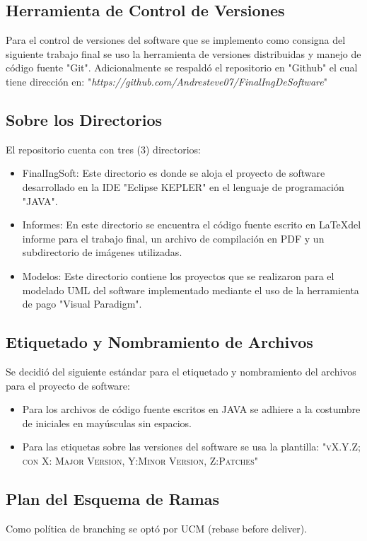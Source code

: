 \documentclass[10pt]{article} %
\begin{document}
\subsection{Herramienta de Control de Versiones}
Para el control de versiones del software que se implemento como consigna del siguiente trabajo final se uso la herramienta de versiones distribuidas y manejo de código fuente "Git". Adicionalmente se respaldó el repositorio en "Github" el cual tiene dirección en: "\textit{https://github.com/Andresteve07/FinalIngDeSoftware}"

\subsection{Sobre los Directorios}
El repositorio cuenta con tres (3) directorios:
\begin{itemize}
\item FinalIngSoft: Este directorio es donde se aloja el proyecto de software desarrollado en la IDE "Eclipse KEPLER" en el lenguaje de programación "JAVA".
\item Informes: En este directorio se encuentra el código fuente escrito en \LaTeX del informe para el trabajo final, un archivo de compilación en PDF y un subdirectorio de imágenes utilizadas.
\item Modelos: Este directorio contiene los proyectos que se realizaron para el modelado UML del software implementado mediante el uso de la herramienta de pago "Visual Paradigm\circledR".
\end{itemize}

\subsection{Etiquetado y Nombramiento de Archivos}
Se decidió del siguiente estándar para el etiquetado y nombramiento del archivos para el proyecto de software:
\begin{itemize}
\item Para los archivos de código fuente escritos en JAVA se adhiere a la costumbre de iniciales en mayúsculas sin espacios.
\item Para las etiquetas sobre las versiones del software se usa la plantilla: "\textsc{vX.Y.Z; con X: Major Version, Y:Minor Version, Z:Patches}"
\end{itemize}

\subsection{Plan del Esquema de Ramas}
Como política de branching se optó por UCM (rebase before deliver).
\end{document}
